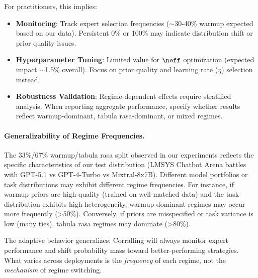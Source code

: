 For practitioners, this implies:
\begin{itemize}[leftmargin=*, itemsep=2pt]
    \item \textbf{Monitoring}: Track expert selection frequencies ($\sim$30-40\% warmup expected based on our data). Persistent 0\% or 100\% may indicate distribution shift or prior quality issues.
    \item \textbf{Hyperparameter Tuning}: Limited value for $\neff$ optimization (expected impact $\sim$1.5\% overall). Focus on prior quality and learning rate ($\eta$) selection instead.
    \item \textbf{Robustness Validation}: Regime-dependent effects require stratified analysis. When reporting aggregate performance, specify whether results reflect warmup-dominant, tabula rasa-dominant, or mixed regimes.
\end{itemize}

\paragraph{Generalizability of Regime Frequencies.}
The 33\%/67\% warmup/tabula rasa split observed in our experiments reflects the specific characteristics of our test distribution (LMSYS Chatbot Arena battles with GPT-5.1 vs GPT-4-Turbo vs Mixtral-8x7B). Different model portfolios or task distributions may exhibit different regime frequencies. For instance, if warmup priors are high-quality (trained on well-matched data) and the task distribution exhibits high heterogeneity, warmup-dominant regimes may occur more frequently (>50\%). Conversely, if priors are misspecified or task variance is low (many ties), tabula rasa regimes may dominate (>80\%).

The adaptive behavior generalizes: Corralling will always monitor expert performance and shift probability mass toward better-performing strategies. What varies across deployments is the \textit{frequency} of each regime, not the \textit{mechanism} of regime switching.

